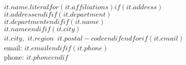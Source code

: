 $it.name.literal$$for(it.affiliations)$$if(it.address)$\\$it.address$$endif$$if(it.department)$\\$it.department$$endif$$if(it.name)$\\$it.name$$endif$$if(it.city)$\\$it.city$,~$it.region$~$it.postal-code$$endif$$endfor$$if(it.email)$\\email: $it.email$$endif$$if(it.phone)$\\phone: $it.phone$$endif$\\